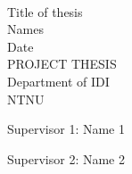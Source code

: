 \thispagestyle{empty}
\mbox{}\\[6pc]
\begin{center}
	\Huge{Title of thesis}\\[2pc]
	
	\Large{Names}\\[1pc]
	\Large{Date}\\[2pc]
	
	PROJECT THESIS\\
	Department of IDI\\
	NTNU
\end{center}
\vfill

\noindent Supervisor 1: Name 1

\noindent Supervisor 2: Name 2
